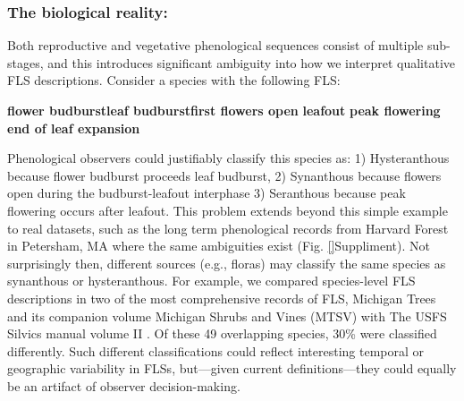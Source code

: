 \documentclass{article}
\begin{document}
\subsubsection*{The biological reality:}
 Both reproductive and vegetative phenological sequences consist of multiple sub-stages, and this introduces significant ambiguity into how we interpret qualitative FLS descriptions. Consider a species with the following FLS:\\
\begin{center}
\textbf{flower budburst}\rightarrow \textbf{leaf budburst}\rightarrow \textbf{first flowers open} \rightarrow \textbf{leafout} \rightarrow \textbf{peak flowering} \rightarrow \textbf{end of leaf expansion}\\
\end{center}
\noindent Phenological observers could justifiably classify this species as: 1) Hysteranthous because flower budburst proceeds leaf budburst, 2) Synanthous because flowers open during the budburst-leafout interphase 3) Seranthous because peak flowering occurs after leafout. This problem extends beyond this simple example to real datasets, such as the long term phenological records from Harvard Forest in Petersham, MA \citep{OKeefe2015} where the same ambiguities exist (Fig. \ref{}Suppliment). Not surprisingly then, different sources (e.g., floras) may classify the same species as synanthous or hysteranthous. For example, we compared species-level FLS descriptions in two of the most comprehensive records of FLS, Michigan Trees and its companion volume Michigan Shrubs and Vines (MTSV) \citep{Barnes2004,Barnes2016} with The USFS Silvics manual volume II \citep{Burns1990}. Of these 49 overlapping species, 30\% were classified differently. Such different classifications could reflect interesting temporal or geographic variability in FLSs, but---given current definitions---they could equally be an artifact of observer decision-making.\\
\end{document}
